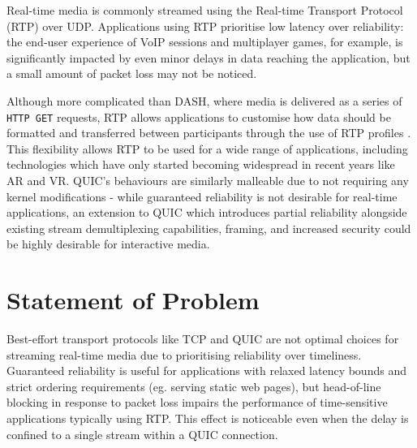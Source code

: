 \documentclass{mprop}
\begin{document}
Real-time media is commonly streamed using the Real-time Transport Protocol (RTP) over UDP. Applications using RTP prioritise low latency over reliability: the end-user experience of VoIP sessions and multiplayer games, for example, is significantly impacted by even minor delays in data reaching the application, but a small amount of packet loss may not be noticed.

Although more complicated than DASH, where media is delivered as a series of \texttt{HTTP GET} requests, RTP allows applications to customise how data should be formatted and transferred between participants through the use of RTP profiles \cite{RTP-RFC}. This flexibility allows RTP to be used for a wide range of applications, including technologies which have only started becoming widespread in recent years like AR and VR. QUIC's behaviours are similarly malleable due to not requiring any kernel modifications - while guaranteed reliability is not desirable for real-time applications, an extension to QUIC which introduces partial reliability alongside existing stream demultiplexing capabilities, framing, and increased security could be highly desirable for interactive media.



\newpage

\section{Statement of Problem}


Best-effort transport protocols like TCP and QUIC are not optimal choices for streaming real-time media due to prioritising reliability over timeliness. Guaranteed reliability is useful for applications with relaxed latency bounds and strict ordering requirements (eg. serving static web pages), but head-of-line blocking in response to packet loss impairs the performance of time-sensitive applications typically using RTP. This effect is noticeable even when the delay is confined to a single stream within a QUIC connection.
\end{document}
